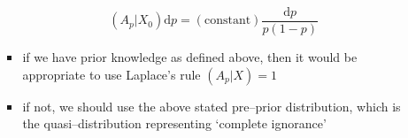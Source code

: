 \documentclass[../jaynes_prob_theory_notes.tex]{subfiles}
\begin{document}
\begin{itemize}
\begin{itemize}
\begin{itemize}
                                        \[
                                            (A_p|X_0)\text{d}p = (\text{constant}) \frac{\text{d}p}{p(1-p)}
                                        \]
                                    \item if we have prior knowledge as defined above, then it would be appropriate to use Laplace's rule \((A_p|X) = 1\)
                                    \item if not, we should use the above stated pre--prior distribution, which is the quasi--distribution representing `complete ignorance'
                                \end{itemize}
                        \end{itemize}
                \end{itemize}
\end{document}
